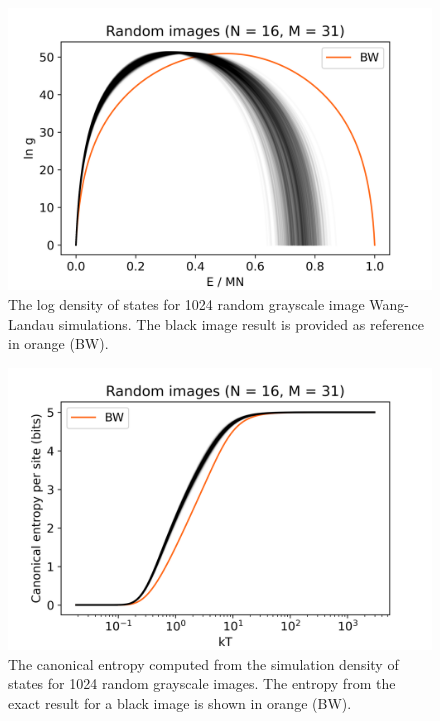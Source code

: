 \documentclass[aps,reprint]{revtex4-2}
\theoremstyle{plain}
\theoremstyle{definition}
\begin{document}
\begin{figure}
  \centering
  \includegraphics[width=\linewidth]{wanglandau-gray}
  \caption{The log density of states for \num{1024} random grayscale image
    Wang-Landau simulations. The black image result is provided as
  reference in orange (BW).}\label{fig:wl-gray}
\end{figure}

\begin{figure}
  \centering
  \includegraphics[width=\linewidth]{wanglandau-gray-S}
  \caption{The canonical entropy computed from the simulation density of states for
    \num{1024} random grayscale images. The entropy from the exact result for a
  black image is shown in orange (BW).}\label{fig:wl-gray-S}
\end{figure}
\end{document}
